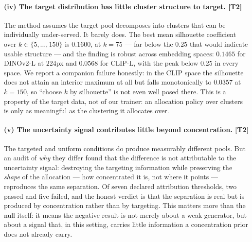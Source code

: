 \documentclass{article}
\begin{document}
\paragraph{(iv) The target distribution has little cluster structure to target. \textnormal{[T2]}}
The method assumes the target pool decomposes into clusters that can be
individually under-served. It barely does. The best mean silhouette coefficient
over $k \in \{5,\dots,150\}$ is $0.1600$, at $k = 75$ --- far below the
$0.25$ that would indicate usable structure --- and the finding is robust across
embedding spaces: $0.1465$ for DINOv2-L at $224$px and $0.0568$ for CLIP-L, with
the peak below $0.25$ in every space.
We report a companion failure honestly: in the CLIP space the silhouette does
not attain an interior maximum at all but falls monotonically to $0.0357$ at
$k = 150$, so ``choose $k$ by silhouette'' is not even well posed there.
This is a property of the target data, not of our trainer: an allocation policy
over clusters is only as meaningful as the clustering it allocates over.

\paragraph{(v) The uncertainty signal contributes little beyond concentration. \textnormal{[T2]}}
The targeted and uniform conditions do produce measurably different pools. But
an audit of \emph{why} they differ found that the difference is not attributable
to the uncertainty signal: destroying the targeting information while preserving
the \emph{shape} of the allocation --- how concentrated it is, not where it
points --- reproduces the same separation. Of seven declared attribution
thresholds, two passed and five failed, and the honest verdict is that the
separation is real but is produced by concentration rather than by targeting.
This matters more than the null itself: it means the negative result is not
merely about a weak generator, but about a signal that, in this setting, carries
little information a concentration prior does not already carry.
\end{document}
